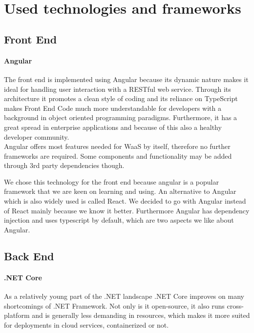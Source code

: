 \documentclass[titlepage, 12pt]{article}
\begin{document}
\pagebreak

\section{Used technologies and frameworks}

\subsection{Front End}

\paragraph{Angular}
The front end is implemented using Angular because its dynamic nature makes it ideal for handling user interaction with a RESTful web service.
Through its architecture it promotes a clean style of coding and its reliance on TypeScript makes Front End Code much more understandable for developers with a background in object oriented programming paradigms.
Furthermore, it has a great spread in enterprise applications and because of this also a healthy developer community. \\
Angular offers most features needed for WaaS by itself, therefore no further frameworks are required. Some components and functionality may be added through 3rd party dependencies though.

We chose this technology for the front end because angular is a popular framework that we are keen on learning and using. An alternative to Angular which is also widely used is called React. We decided to go with Angular instead of React mainly because we know it better. Furthermore Angular has dependency injection and uses typescript by default, which are two aspects we like about Angular.

\subsection{Back End}

\paragraph{.NET Core}
As a relatively young part of the .NET landscape .NET Core improves on many shortcomings of .NET Framework. Not only is it open-source, it also runs cross-platform and is generally less demanding in resources,
which makes it more suited for deployments in cloud services, containerized or not.
\end{document}
